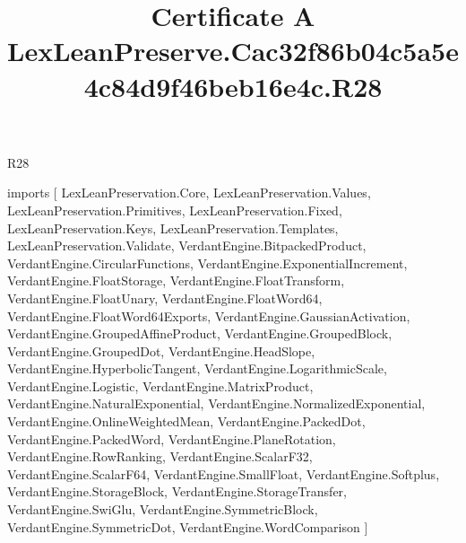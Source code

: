 \begin{lexlean}{R28}
\title{Certificate A LexLeanPreserve.Cac32f86b04c5a5e4c84d9f46beb16e4c.R28}
\begin{coremodule}
imports [
  LexLeanPreservation.Core,
  LexLeanPreservation.Values,
  LexLeanPreservation.Primitives,
  LexLeanPreservation.Fixed,
  LexLeanPreservation.Keys,
  LexLeanPreservation.Templates,
  LexLeanPreservation.Validate,
  VerdantEngine.BitpackedProduct,
  VerdantEngine.CircularFunctions,
  VerdantEngine.ExponentialIncrement,
  VerdantEngine.FloatStorage,
  VerdantEngine.FloatTransform,
  VerdantEngine.FloatUnary,
  VerdantEngine.FloatWord64,
  VerdantEngine.FloatWord64Exports,
  VerdantEngine.GaussianActivation,
  VerdantEngine.GroupedAffineProduct,
  VerdantEngine.GroupedBlock,
  VerdantEngine.GroupedDot,
  VerdantEngine.HeadSlope,
  VerdantEngine.HyperbolicTangent,
  VerdantEngine.LogarithmicScale,
  VerdantEngine.Logistic,
  VerdantEngine.MatrixProduct,
  VerdantEngine.NaturalExponential,
  VerdantEngine.NormalizedExponential,
  VerdantEngine.OnlineWeightedMean,
  VerdantEngine.PackedDot,
  VerdantEngine.PackedWord,
  VerdantEngine.PlaneRotation,
  VerdantEngine.RowRanking,
  VerdantEngine.ScalarF32,
  VerdantEngine.ScalarF64,
  VerdantEngine.SmallFloat,
  VerdantEngine.Softplus,
  VerdantEngine.StorageBlock,
  VerdantEngine.StorageTransfer,
  VerdantEngine.SwiGlu,
  VerdantEngine.SymmetricBlock,
  VerdantEngine.SymmetricDot,
  VerdantEngine.WordComparison
]


\end{coremodule}
\end{lexlean}
